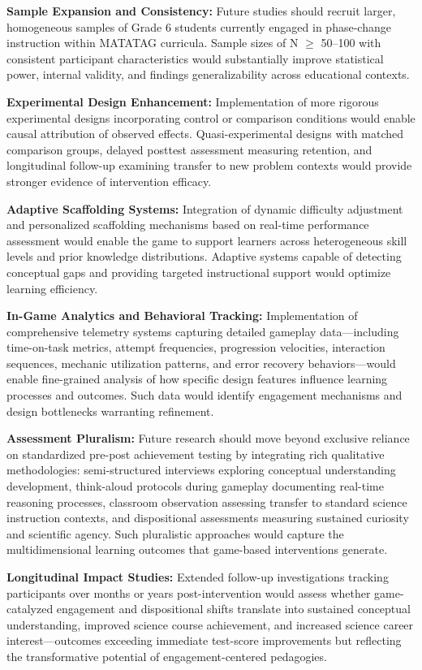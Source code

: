 \textbf{Sample Expansion and Consistency:} Future studies should recruit larger, homogeneous samples of Grade 6 students currently engaged in phase-change instruction within MATATAG curricula. Sample sizes of N $\geq$ 50--100 with consistent participant characteristics would substantially improve statistical power, internal validity, and findings generalizability across educational contexts.

\textbf{Experimental Design Enhancement:} Implementation of more rigorous experimental designs incorporating control or comparison conditions would enable causal attribution of observed effects. Quasi-experimental designs with matched comparison groups, delayed posttest assessment measuring retention, and longitudinal follow-up examining transfer to new problem contexts would provide stronger evidence of intervention efficacy.

\textbf{Adaptive Scaffolding Systems:} Integration of dynamic difficulty adjustment and personalized scaffolding mechanisms based on real-time performance assessment would enable the game to support learners across heterogeneous skill levels and prior knowledge distributions. Adaptive systems capable of detecting conceptual gaps and providing targeted instructional support would optimize learning efficiency.

\textbf{In-Game Analytics and Behavioral Tracking:} Implementation of comprehensive telemetry systems capturing detailed gameplay data---including time-on-task metrics, attempt frequencies, progression velocities, interaction sequences, mechanic utilization patterns, and error recovery behaviors---would enable fine-grained analysis of how specific design features influence learning processes and outcomes. Such data would identify engagement mechanisms and design bottlenecks warranting refinement.

\textbf{Assessment Pluralism:} Future research should move beyond exclusive reliance on standardized pre-post achievement testing by integrating rich qualitative methodologies: semi-structured interviews exploring conceptual understanding development, think-aloud protocols during gameplay documenting real-time reasoning processes, classroom observation assessing transfer to standard science instruction contexts, and dispositional assessments measuring sustained curiosity and scientific agency. Such pluralistic approaches would capture the multidimensional learning outcomes that game-based interventions generate.

\textbf{Longitudinal Impact Studies:} Extended follow-up investigations tracking participants over months or years post-intervention would assess whether game-catalyzed engagement and dispositional shifts translate into sustained conceptual understanding, improved science course achievement, and increased science career interest---outcomes exceeding immediate test-score improvements but reflecting the transformative potential of engagement-centered pedagogies.

